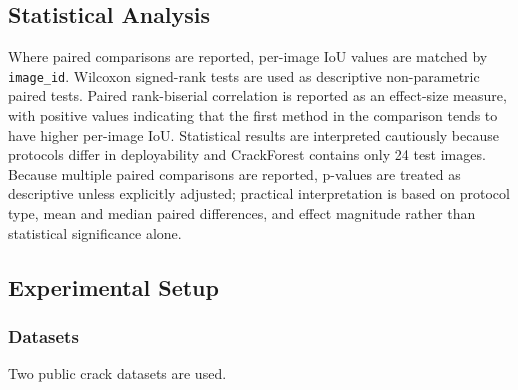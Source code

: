 \documentclass[applsci,article,submit,pdftex,moreauthors]{Definitions/mdpi}
\begin{document}
\subsection{Statistical Analysis}

Where paired comparisons are reported, per-image IoU values are matched
by \texttt{image\_id}. Wilcoxon signed-rank tests are used as
descriptive non-parametric paired tests. Paired rank-biserial
correlation is reported as an effect-size measure, with positive values
indicating that the first method in the comparison tends to have higher
per-image IoU. Statistical results are interpreted cautiously because
protocols differ in deployability and CrackForest contains only 24 test
images. Because multiple paired comparisons are reported, p-values are
treated as descriptive unless explicitly adjusted; practical
interpretation is based on protocol type, mean and median paired
differences, and effect magnitude rather than statistical significance
alone.

\subsection{Experimental Setup}

\subsubsection{Datasets}

Two public crack datasets are used.
\end{document}
